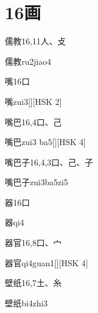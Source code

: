
\section*{16画}

\begin{entry}{儒教}{16,11}{⼈、⽁}
  \begin{phonetics}{儒教}{ru2jiao4}
  \end{phonetics}
\end{entry}

\begin{entry}{嘴}{16}{⼝}
  \begin{phonetics}{嘴}{zui3}[][HSK 2]
  \end{phonetics}
\end{entry}

\begin{entry}{嘴巴}{16,4}{⼝、⼰}
  \begin{phonetics}{嘴巴}{zui3 ba5}[][HSK 4]
  \end{phonetics}
\end{entry}

\begin{entry}{嘴巴子}{16,4,3}{⼝、⼰、⼦}
  \begin{phonetics}{嘴巴子}{zui3ba5zi5}
  \end{phonetics}
\end{entry}

\begin{entry}{器}{16}{⼝}
  \begin{phonetics}{器}{qi4}
  \end{phonetics}
\end{entry}

\begin{entry}{器官}{16,8}{⼝、⼧}
  \begin{phonetics}{器官}{qi4guan1}[][HSK 4]
  \end{phonetics}
\end{entry}

\begin{entry}{壁纸}{16,7}{⼟、⽷}
  \begin{phonetics}{壁纸}{bi4zhi3}
  \end{phonetics}
\end{entry}

